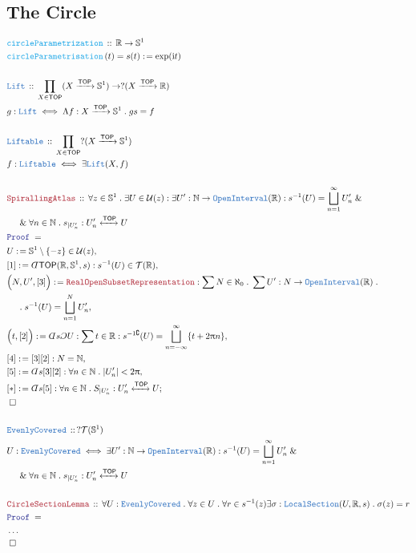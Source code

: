 \documentclass[12pt]{scrartcl}
\newcommand{\TYPE}[1]{\textcolor{NavyBlue}{\mathtt{#1}}}
\newcommand{\FUNC}[1]{\textcolor{Cerulean}{\mathtt{#1}}}
\newcommand{\LOGIC}[1]{\textcolor{Blue}{\mathtt{#1}}}
\newcommand{\THM}[1]{\textcolor{Maroon}{\mathtt{#1}}}
\renewcommand{\.}{\; . \;}
\newcommand{\de}{: \kern 0.1pc =}
\newcommand{\Act}[1]{\left( #1 \right)}
\newcommand{\Theorem}[2]{& \THM{#1} \, :: \, #2 \\ & \Proof = \\ }
\newcommand{\DeclareType}[2]{& \TYPE{#1} \, :: \, #2 \\}
\newcommand{\DefineType}[3]{& #1 : \TYPE{#2} \iff #3 \\}
\newcommand{\DeclareFunc}[2]{& \FUNC{#1} \, :: \, #2 \\}
\newcommand{\DefineNamedFunc}[4]{&  \FUNC{#1}\Act{#2} = #3 \de #4 \\}
\newcommand{\NewLine}{\\ & \kern 1pc}
\newcommand{\Page}[1]{ \begin{align*} #1 \end{align*}   }
\newcommand{ \bd }{ \ByDef }
\newcommand{\NoProof}{ & \ldots \\ \EndProof}
\renewcommand{\And}{\; \& \;}
\newcommand{\Reals}{\mathbb{R} }
\newcommand{\Sphere}{\mathbb{S}}
\newcommand{\Nat}{\mathbb{N} }
\newcommand{\ToIso}{\xleftrightarrow}
\newcommand{\Arrow}{\xrightarrow}
\renewcommand{\c}{\complement}
\newcommand{\Say}[3]{& #1 \de #2 : #3, \\}
\newcommand{\SayIn}[3]{& #1 \de #2 \in #3, \\}
\newcommand{\Conclude}[3]{& #1 \de #2 : #3; \\}
\newcommand{\QED}{\; \square}
\newcommand{\EndProof}{& \QED \\}
\newcommand{\ByDef}{\rotatebox[origin=c]{-180}{$D$}}%
\newcommand{\ByConstr}{\rotatebox[origin=c]{-180}{$C$}}%
\newcommand{\Proof}{\LOGIC{Proof} \; }
\newcommand{\TOP}{\mathsf{TOP}}
\newcommand{\T}{\mathcal{T}}
\newcommand{\U}{\mathcal{U}}
\begin{document}
\subsection{The Circle }
\Page{
	\DeclareFunc{circleParametrization}
	{
		\Reals \to \Sphere^1
	}
	\DefineNamedFunc{circleParametrisation}{t}{s(t)}
	{
		\exp(\mathrm{i}t)
	}
	\\
	\DeclareType{Lift}{\prod_{X \in \TOP} (X \Arrow{\TOP} \Sphere^1) \to ?(X \Arrow{\TOP} \Reals) }
	\DefineType{g}{Lift}{\Lambda f : X \Arrow{\TOP} \Sphere^1 \. g s = f }
	\\
	\DeclareType{Liftable}{\prod_{X \in \TOP} ?(X \Arrow{\TOP} \Sphere^1)}
	\DefineType{f}{Liftable}{\exists \TYPE{Lift}(X,f)}
	\\
	\Theorem{SpirallingAtlas}
	{
		\forall z \in \Sphere^1 \. 
		\exists U \in \U(z) :
		\exists U' : \Nat \to \TYPE{OpenInterval}(\Reals) :
		s^{-1}(U) = \bigsqcup^\infty_{n=1} U'_n \And \NewLine \And \forall n \in \Nat \.
		s_{|U'_n} : U'_n \ToIso{\TOP} U
	}
	\SayIn{U}{\Sphere^1 \setminus \{-z\}}{\U(z)}
	\Say{[1]}{\bd \TOP(\Reals,\Sphere^1,s) }{s^{-1}(U) \in \T(\Reals)}
	\Say{\Big( N, U', [3]\Big)}{\THM{RealOpenSubsetRepresentation}}
	{
		\sum N \in \aleph_0 \. \sum U' : N \to \TYPE{OpenInterval}(\Reals) \.
		\NewLine \. 
		s^{-1}(U) = \bigsqcup^N_{n=1} U'_n
	}
	\Say{\Big(t, [2]\Big)}{\bd s \ByConstr U}{
		\sum t \in \Reals : s^{-1\c}(U) = \bigsqcup^\infty_{n=-\infty} \{ t + 2\uppi n \}
	}
	\Say{[4]}{[3][2]}{N = \Nat}
	\Say{[5]}{\bd s [3][2]}{  \forall n \in \Nat \. |U'_n| < 2 \uppi }
	\Conclude{[*]}{\bd s [5]}
	{
		\forall n \in \Nat \. S_{|U'_n} : U'_n \ToIso{\TOP} U
	}
	\EndProof
	\\
	\DeclareType{EvenlyCovered}{?\T(\Sphere^1)}
	\DefineType{U}{EvenlyCovered}{
		\exists U' : \Nat \to \TYPE{OpenInterval}(\Reals) :
		s^{-1}(U) = \bigsqcup^\infty_{n=1} U'_n \And \NewLine \And \forall n \in \Nat \.
		s_{|U'_n} : U'_n \ToIso{\TOP} U	
	}
	\\
	\Theorem{CircleSectionLemma}
	{
		\forall U : \TYPE{EvenlyCovered} \.
		\forall z \in U \.
		\forall r \in s^{-1}(z)
		\exists \sigma : \TYPE{LocalSection}(U,\Reals,s) \.
		\sigma(z) = r
	}
	\NoProof
}
\end{document}
